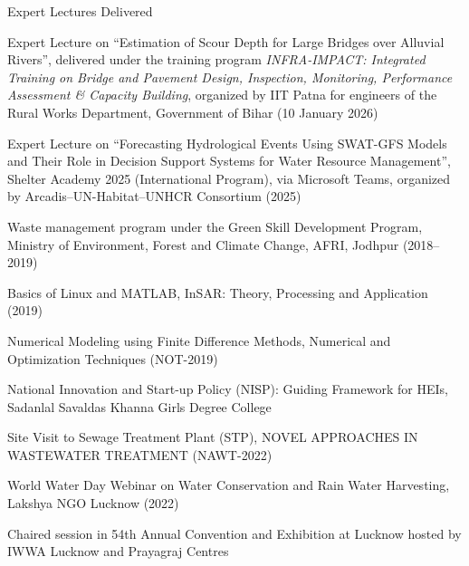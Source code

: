 \begin{rubric}{Expert Lectures Delivered}

\entry*{} Expert Lecture on ``Estimation of Scour Depth for Large Bridges over Alluvial Rivers'', delivered under the training program \textit{INFRA-IMPACT: Integrated Training on Bridge and Pavement Design, Inspection, Monitoring, Performance Assessment \& Capacity Building}, organized by IIT Patna for engineers of the Rural Works Department, Government of Bihar (10 January 2026)

\entry*{} Expert Lecture on ``Forecasting Hydrological Events Using SWAT-GFS Models and Their Role in Decision Support Systems for Water Resource Management'', Shelter Academy 2025 (International Program), via Microsoft Teams, organized by Arcadis--UN-Habitat--UNHCR Consortium (2025)

\entry*{} Waste management program under the Green Skill Development Program, Ministry of Environment, Forest and Climate Change, AFRI, Jodhpur (2018--2019)

\entry*{} Basics of Linux and MATLAB, InSAR: Theory, Processing and Application (2019)

\entry*{} Numerical Modeling using Finite Difference Methods, Numerical and Optimization Techniques (NOT-2019)

\entry*{} National Innovation and Start-up Policy (NISP): Guiding Framework for HEIs, Sadanlal Savaldas Khanna Girls Degree College

\entry*{} Site Visit to Sewage Treatment Plant (STP), NOVEL APPROACHES IN WASTEWATER TREATMENT (NAWT-2022)

\entry*{} World Water Day Webinar on Water Conservation and Rain Water Harvesting, Lakshya NGO Lucknow (2022)

\entry*{} Chaired session in 54th Annual Convention and Exhibition at Lucknow hosted by IWWA Lucknow and Prayagraj Centres

\end{rubric}